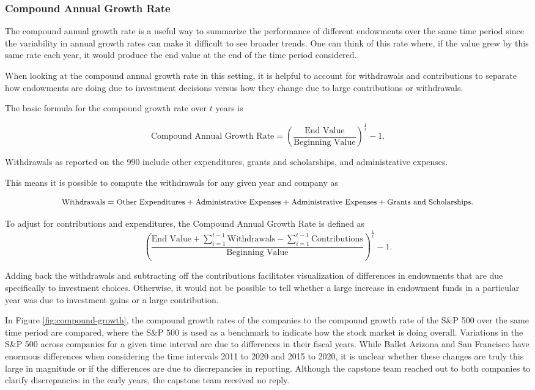 \documentclass[Dance Data
Project,article,submit,moreauthors,pdftex]{mdpi}
\begin{document}
\hypertarget{endowment-time}{%
\subsubsection{Compound Annual Growth Rate}\label{endowment-time}}

The compound annual growth rate is a useful way to summarize the
performance of different endowments over the same time period since the
variability in annual growth rates can make it difficult to see broader
trends. One can think of this rate where, if the value grew by this same
rate each year, it would produce the end value at the end of the time
period considered.

When looking at the compound annual growth rate in this setting, it is
helpful to account for withdrawals and contributions to separate how
endowments are doing due to investment decisions versus how they change
due to large contributions or withdrawals.

The basic formula for the compound growth rate over \(t\) years is

\[{\text{Compound Annual Growth Rate} = \left( \frac{\text{End Value}}{\text{Beginning Value}}\right)^{\frac{1}{t}}-1}.\]

Withdrawals as reported on the 990 include other expenditures, grants
and scholarships, and administrative expenses.

This means it is possible to compute the withdrawals for any given year
and company as

\[\small{\text{Withdrawals} = \text{Other Expenditures} +\text{Administrative Expenses} +\text{Administrative Expenses} + \text{Grants and Scholarships}}.\]

To adjust for contributions and expenditures, the Compound Annual Growth
Rate is defined as
\[{\left( \frac{\text{End Value} + \sum_{i=1}^{t-1} \text{Withdrawals} - \sum_{i=1}^{t-1} \text{Contributions}  }{\text{Beginning Value}} \right)^{\frac{1}{t}}-1}.\]

Adding back the withdrawals and subtracting off the contributions
facilitates visualization of differences in endowments that are due
specifically to investment choices. Otherwise, it would not be possible
to tell whether a large increase in endowment funds in a particular year
was due to investment gains or a large contribution.

In Figure \ref{fig:compound-growth}, the compound growth rates of the
companies to the compound growth rate of the S\&P 500 over the same time
period are compared, where the S\&P 500 is used as a benchmark to
indicate how the stock market is doing overall. Variations in the S\&P
500 across companies for a given time interval are due to differences in
their fiscal years. While Ballet Arizona and San Francisco have enormous
differences when considering the time intervals 2011 to 2020 and 2015 to
2020, it is unclear whether these changes are truly this large in
magnitude or if the differences are due to discrepancies in reporting.
Although the capstone team reached out to both companies to clarify
discrepancies in the early years, the capstone team received no reply.
\end{document}
